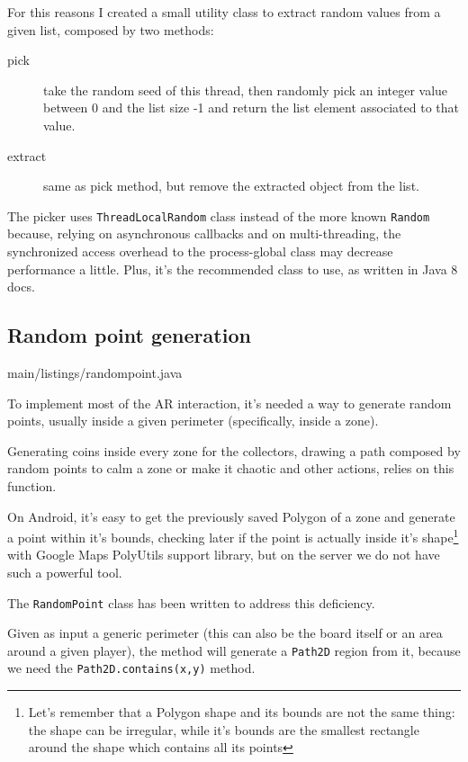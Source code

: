 			For this reasons I created a small utility class to extract random values from a given list, composed by two methods:
			\begin{description}
				\item[pick] take the random seed of this thread, then randomly pick an integer value between 0 and the list size -1 and return the list element associated to that value. 
				\item[extract] same as pick method, but remove the extracted object from the list.
			\end{description}
		
			The picker uses \lstinline|ThreadLocalRandom| class instead of the more known \lstinline|Random| because, relying on asynchronous callbacks and on multi-threading, the synchronized access overhead to the process-global class may decrease performance a little.
			Plus, it's the recommended class to use, as written in Java 8 docs.
						
		\subsection{Random point generation}\label{focus:point}
		
			
							{main/listings/randompoint.java}
			
			To implement most of the AR interaction, it's needed a way to generate random points, usually inside a given perimeter (specifically, inside a zone).
			
			Generating coins inside every zone for the collectors, drawing a path composed by random points to calm a zone or make it chaotic and other actions, relies on this function.
			
			On Android, it's easy to get the previously saved Polygon of a zone and generate a point within it's bounds, checking later if the point is actually inside it's shape\footnote{Let's remember that a Polygon shape and its bounds are not the same thing: the shape can be irregular, while it's bounds are the smallest rectangle around the shape which contains all its points} with Google Maps PolyUtils support library, but on the server we do not have such a powerful tool.
			
			The \lstinline|RandomPoint| class has been written to address this deficiency.
			
			Given as input a generic perimeter (this can also be the board itself or an area around a given player), the method will generate a \lstinline|Path2D| region from it, because we need the \lstinline|Path2D.contains(x,y)| method.
			

